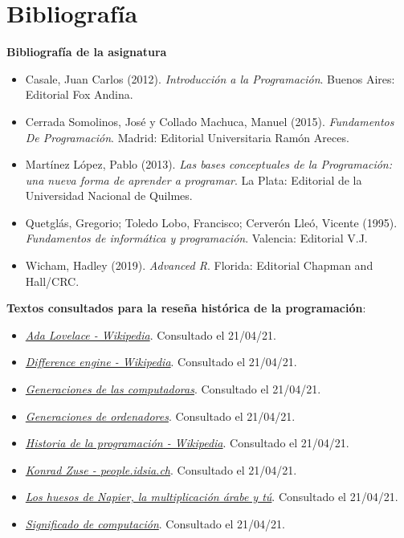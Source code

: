 \documentclass[
]{book}
\providecommand{\tightlist}{%
  \setlength{\itemsep}{0pt}\setlength{\parskip}{0pt}}
\begin{document}
\hypertarget{bibliografuxeda}{%
\chapter*{Bibliografía}\label{bibliografuxeda}}

\textbf{Bibliografía de la asignatura}

\begin{itemize}
\tightlist
\item
  Casale, Juan Carlos (2012). \emph{Introducción a la Programación}. Buenos Aires: Editorial Fox Andina.
\item
  Cerrada Somolinos, José y Collado Machuca, Manuel (2015). \emph{Fundamentos De Programación}. Madrid: Editorial Universitaria Ramón Areces.
\item
  Martínez López, Pablo (2013). \emph{Las bases conceptuales de la Programación: una nueva forma de aprender a programar}. La Plata: Editorial de la Universidad Nacional de Quilmes.
\item
  Quetglás, Gregorio; Toledo Lobo, Francisco; Cerverón Lleó, Vicente (1995). \emph{Fundamentos de informática y programación}. Valencia: Editorial V.J.
\item
  Wicham, Hadley (2019). \emph{Advanced R}. Florida: Editorial Chapman and Hall/CRC.
\end{itemize}

\textbf{Textos consultados para la reseña histórica de la programación}:

\begin{itemize}
\tightlist
\item
  \href{https://es.wikipedia.org/wiki/Ada_Lovelace}{\emph{Ada Lovelace - Wikipedia}}. Consultado el 21/04/21.
\item
  \href{https://en.wikipedia.org/wiki/Difference_engine}{\emph{Difference engine - Wikipedia}}. Consultado el 21/04/21.
\item
  \href{https://www.nextu.com/blog/generaciones-de-las-computadoras/}{\emph{Generaciones de las computadoras}}. Consultado el 21/04/21.
\item
  \href{https://www.profesionalreview.com/2018/10/13/generaciones-de-ordenadores/}{\emph{Generaciones de ordenadores}}. Consultado el 21/04/21.
\item
  \href{https://es.wikipedia.org/wiki/Anexo:Historia_de_la_computaci\%C3\%B3n}{\emph{Historia de la programación - Wikipedia}}. Consultado el 21/04/21.
\item
  \href{https://people.idsia.ch/~juergen/zuse.html}{\emph{Konrad Zuse - people.idsia.ch}}. Consultado el 21/04/21.
\item
  \href{https://culturacientifica.com/2016/10/05/los-huesos-napier-la-multiplicacion-arabe/\#:~:text=Los\%20huesos\%20de\%20Napier\%2C\%20tambi\%C3\%A9n,de\%20las\%20tablas\%20de\%20multiplicar}{\emph{Los huesos de Napier, la multiplicación árabe y tú}}. Consultado el 21/04/21.
\item
  \href{https://www.significados.com/computacion/}{\emph{Significado de computación}}. Consultado el 21/04/21.
\end{itemize}
\end{document}
